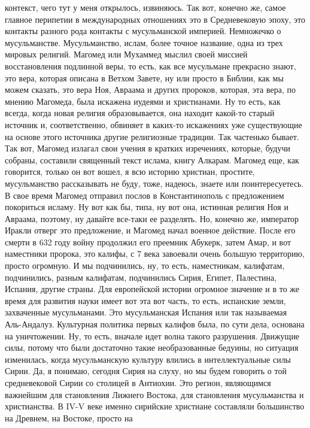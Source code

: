 контекст, чего тут у меня открылось, извиняюсь. Так вот, конечно же, самое
главное перипетии в международных отношениях это в Средневековую эпоху, это
контакты разного рода контакты с мусульманской империей. Немножечко о
мусульманстве. Мусульманство, ислам, более точное название, одна из трех мировых
религий. Магомед или Мухаммед мыслил своей миссией восстановления подлинной
веры, то есть, как все мусульмане прекрасно знают, это вера, которая описана в
Ветхом Завете, ну или просто в Библии, как мы можем сказать, это вера Ноя,
Авраама и других пророков, которая, эта вера, по мнению Магомеда, была искажена
иудеями и христианами. Ну то есть, как всегда, когда новая религия
образовывается, она находит какой-то старый источник и, соответственно, обвиняет
в каких-то искажениях уже существующие на основе этого источника другие
религиозные традиции. Так частенько бывает. Так вот, Магомед излагал свои учения
в кратких изречениях, которые, будучи собраны, составили священный текст ислама,
книгу Алкарам. Магомед еще, как говорится, только он вот вошел, я всю историю
христиан, простите, мусульманство рассказывать не буду, тоже, надеюсь, знаете
или поинтересуетесь. В свое время Магомед отправил послов в Константинополь с
предложением покориться исламу. Ну вот как бы, типа, ну вот она, истинная
религия Ноя и Авраама, поэтому, ну давайте все-таки ее разделять. Но, конечно
же, император Иракли отверг это предложение, и Магомед начал военное действие.
После его смерти в 632 году войну продолжил его преемник Абукерк, затем Амар, и
вот наместники пророка, это калифы, с 7 века завоевали очень большую территорию,
просто огромную. И мы подчинились, ну, то есть, наместникам, калифатам,
подчинились, разным калифатам, подчинились Сирия, Египет, Палестина, Испания,
другие страны. Для европейской истории огромное значение и в то же время для
развития науки имеет вот эта вот часть, то есть, испанские земли, захваченные
мусульманами. Это мусульманская Испания или так называемая Аль-Андалуз.
Культурная политика первых калифов была, по сути дела, основана на уничтожении.
Ну, то есть, вначале идет волна такого разрушения. Движущие силы, потому что
были достаточно такие необразованные бедуины, но ситуация изменилась, когда
мусульманскую культуру влились в интеллектуальные силы Сирии. Да, я понимаю,
сегодня Сирия на слуху, но мы будем говорить о той средневековой Сирии со
столицей в Антиохии. Это регион, являющимся важнейшим для становления Лижнего
Востока, для становления мусульманства и христианства. В IV-V веке именно
сирийские христиане составляли большинство на Древнем, на Востоке, просто на
